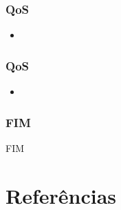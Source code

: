 \documentclass[]{beamer}
\begin{document}
\begin{frame}
  \frametitle{QoS}
\begin{itemize}
  \item 
\end{itemize}
\end{frame}

\begin{frame}
  \frametitle{QoS}
\begin{itemize}
  \item 
\end{itemize}
\end{frame}






\begin{frame}
 \frametitle{FIM}
   FIM%
\end{frame}

\section{Referências}

%

\end{document}

